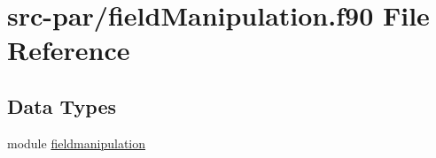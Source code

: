 \hypertarget{fieldManipulation_8f90}{\section{src-\/par/field\-Manipulation.f90 File Reference}
\label{fieldManipulation_8f90}
}
\subsection*{Data Types}
\begin{DoxyCompactItemize}
\item 
module \hyperlink{classfieldmanipulation}{fieldmanipulation}
\end{DoxyCompactItemize}
